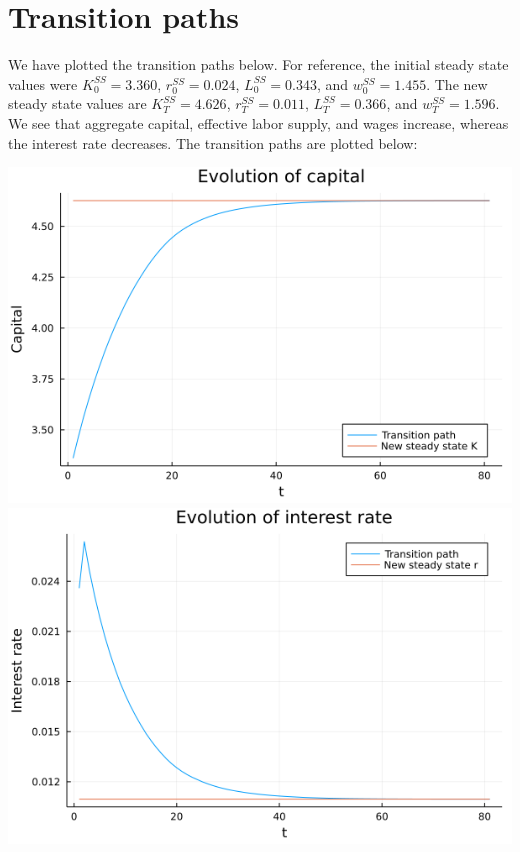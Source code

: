 \documentclass[12pt]{article}
\begin{document}
\section{Transition paths}
We have plotted the transition paths below. For reference, the initial steady state values were $K_0^{SS} = 3.360$, $r_0^{SS} = 0.024$, $L_0^{SS} = 0.343$, and $w_0^{SS} = 1.455$. The new steady state values are $K_T^{SS} = 4.626$, $r_T^{SS} = 0.011$, $L_T^{SS} = 0.366$, and $w_T^{SS} = 1.596$. We see that aggregate capital, effective labor supply, and wages increase, whereas the interest rate decreases. The transition paths are plotted below:
\begin{center}
\includegraphics[scale= 0.35]{kplot.png}\includegraphics[scale= 0.35]{rplot.png}\\

\end{center}
\end{document}
